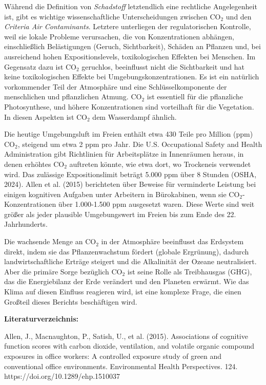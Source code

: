 \documentclass[12pt,paper=a4,DIV=12,parskip=never,chapterprefix=false,headings=standardclasses]{scrreprt}
\begin{document}
Während die Definition von \emph{Schadstoff} letztendlich eine rechtliche Angelegenheit ist, gibt es wichtige wissenschaftliche Unterscheidungen zwischen CO$_2$ und den \emph{Criteria Air Contaminants}. Letztere unterliegen der regulatorischen Kontrolle, weil sie lokale Probleme verursachen, die von Konzentrationen abhängen, einschließlich Belästigungen (Geruch, Sichtbarkeit), Schäden an Pflanzen und, bei ausreichend hohen Expositionslevels, toxikologischen Effekten bei Menschen. Im Gegensatz dazu ist CO$_2$ geruchlos, beeinflusst nicht die Sichtbarkeit und hat keine toxikologischen Effekte bei Umgebungskonzentrationen. Es ist ein natürlich vorkommender Teil der Atmosphäre und eine Schlüsselkomponente der menschlichen und pflanzlichen Atmung. CO$_2$ ist essentiell für die pflanzliche Photosynthese, und höhere Konzentrationen sind vorteilhaft für die Vegetation. In diesen Aspekten ist CO$_2$ dem Wasserdampf ähnlich.

Die heutige Umgebungsluft im Freien enthält etwa 430 Teile pro Million (ppm) CO$_2$, steigend um etwa 2 ppm pro Jahr. Die U.S. Occupational Safety and Health Administration gibt Richtlinien für Arbeitsplätze in Innenräumen heraus, in denen erhöhtes CO$_2$ auftreten könnte, wie etwa dort, wo Trockeneis verwendet wird. Das zulässige Expositionslimit beträgt 5.000 ppm über 8 Stunden (OSHA, 2024). Allen et al. (2015) berichteten über Beweise für verminderte Leistung bei einigen kognitiven Aufgaben unter Arbeitern in Bürokabinen, wenn sie CO$_2$-Konzentrationen über 1.000-1.500 ppm ausgesetzt waren. Diese Werte sind weit größer als jeder plausible Umgebungswert im Freien bis zum Ende des 22. Jahrhunderts.

Die wachsende Menge an CO$_2$ in der Atmosphäre beeinflusst das Erdsystem direkt, indem sie das Pflanzenwachstum fördert (globale Ergrünung), dadurch landwirtschaftliche Erträge steigert und die Alkalinität der Ozeane neutralisiert. Aber die primäre Sorge bezüglich CO$_2$ ist seine Rolle als Treibhausgas (GHG), das die Energiebilanz der Erde verändert und den Planeten erwärmt. Wie das Klima auf diesen Einfluss reagieren wird, ist eine komplexe Frage, die einen Großteil dieses Berichts beschäftigen wird.

\vfill
\noindent\textbf{Literaturverzeichnis:}

\begingroup
\parindent=0pt
\everypar{\hangindent=2em\hangafter=1\relax}

Allen, J., Macnaughton, P., Satish, U., et al. (2015). Associations of cognitive function scores with carbon dioxide, ventilation, and volatile organic compound exposures in office workers: A controlled exposure study of green and conventional office environments. Environmental Health Perspectives. 124. https://doi.org/10.1289/ehp.1510037
\end{document}
